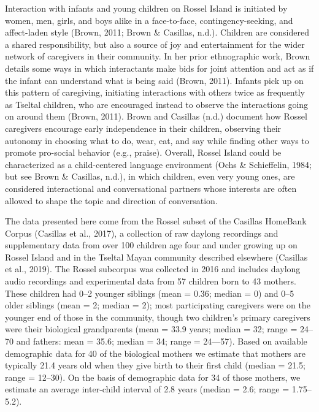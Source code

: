\documentclass[
  english,
  ,man,floatsintext]{apa6}
\begin{document}
Interaction with infants and young children on Rossel Island is initiated by women, men, girls, and boys alike in a face-to-face, contingency-seeking, and affect-laden style (Brown, 2011; Brown \& Casillas, n.d.). Children are considered a shared responsibility, but also a source of joy and entertainment for the wider network of caregivers in their community. In her prior ethnographic work, Brown details some ways in which interactants make bids for joint attention and act as if the infant can understand what is being said (Brown, 2011). Infants pick up on this pattern of caregiving, initiating interactions with others twice as frequently as Tseltal children, who are encouraged instead to observe the interactions going on around them (Brown, 2011). Brown and Casillas (n.d.) document how Rossel caregivers encourage early independence in their children, observing their autonomy in choosing what to do, wear, eat, and say while finding other ways to promote pro-social behavior (e.g., praise). Overall, Rossel Island could be characterized as a child-centered language environment (Ochs \& Schieffelin, 1984; but see Brown \& Casillas, n.d.), in which children, even very young ones, are considered interactional and conversational partners whose interests are often allowed to shape the topic and direction of conversation.

The data presented here come from the Rossel subset of the Casillas HomeBank Corpus (Casillas et al., 2017), a collection of raw daylong recordings and supplementary data from over 100 children age four and under growing up on Rossel Island and in the Tseltal Mayan community described elsewhere (Casillas et al., 2019). The Rossel subcorpus was collected in 2016 and includes daylong audio recordings and experimental data from 57 children born to 43 mothers. These children had 0--2 younger siblings (mean = 0.36; median = 0) and 0--5 older siblings (mean = 2; median = 2); most participating caregivers were on the younger end of those in the community, though two children's primary caregivers were their biological grandparents (mean = 33.9 years; median = 32; range = 24--70 and fathers: mean = 35.6; median = 34; range = 24---57). Based on available demographic data for 40 of the biological mothers we estimate that mothers are typically 21.4 years old when they give birth to their first child (median = 21.5; range = 12--30). On the basis of demographic data for 34 of those mothers, we estimate an average inter-child interval of 2.8 years (median = 2.6; range = 1.75--5.2).
\end{document}
